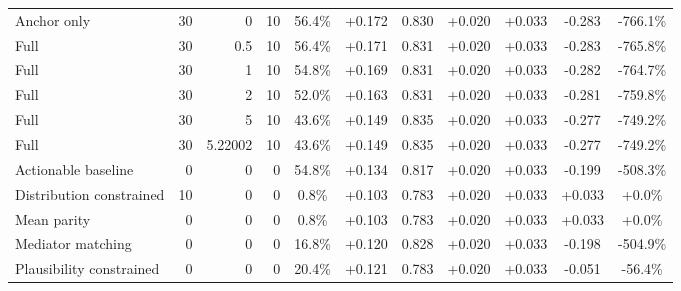 \begin{table}[htbp]
\begin{tabular}{lrrrccccccc}
Anchor only & 30 & 0 & 10 & 56.4\% & +0.172 & 0.830 & +0.020 & +0.033 & -0.283 & -766.1\% \\
Full & 30 & 0.5 & 10 & 56.4\% & +0.171 & 0.831 & +0.020 & +0.033 & -0.283 & -765.8\% \\
Full & 30 & 1 & 10 & 54.8\% & +0.169 & 0.831 & +0.020 & +0.033 & -0.282 & -764.7\% \\
Full & 30 & 2 & 10 & 52.0\% & +0.163 & 0.831 & +0.020 & +0.033 & -0.281 & -759.8\% \\
Full & 30 & 5 & 10 & 43.6\% & +0.149 & 0.835 & +0.020 & +0.033 & -0.277 & -749.2\% \\
Full & 30 & 5.22002 & 10 & 43.6\% & +0.149 & 0.835 & +0.020 & +0.033 & -0.277 & -749.2\% \\
Actionable baseline & 0 & 0 & 0 & 54.8\% & +0.134 & 0.817 & +0.020 & +0.033 & -0.199 & -508.3\% \\
Distribution constrained & 10 & 0 & 0 & 0.8\% & +0.103 & 0.783 & +0.020 & +0.033 & +0.033 & +0.0\% \\
Mean parity & 0 & 0 & 0 & 0.8\% & +0.103 & 0.783 & +0.020 & +0.033 & +0.033 & +0.0\% \\
Mediator matching & 0 & 0 & 0 & 16.8\% & +0.120 & 0.828 & +0.020 & +0.033 & -0.198 & -504.9\% \\
Plausibility constrained & 0 & 0 & 0 & 20.4\% & +0.121 & 0.783 & +0.020 & +0.033 & -0.051 & -56.4\% \\
\bottomrule
\end{tabular}
\end{table}
